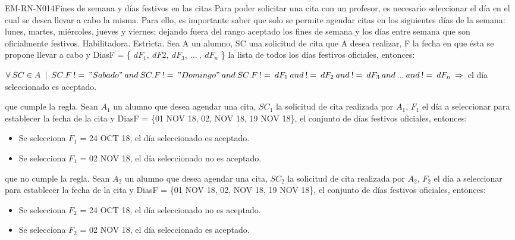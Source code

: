 \begin{BussinesRule}{EM-RN-N014}{Fines de semana y días festivos en las citas}
	\BRitem[Descripción:] Para poder solicitar una cita con un profesor, es necesario seleccionar el día en el cual se desea llevar a cabo la misma. Para ello, es importante saber que solo se permite agendar citas en los siguientes días de la semana: lunes, martes, miércoles, jueves y viernes; dejando fuera del rango aceptado los fines de semana y los días entre semana que son oficialmente festivos. 
	\BRitem[Tipo: ] Habilitadora.
	\BRitem[Nivel: ] Estricta.
	\BRitem[Sentencia : ] Sea A un alumno, SC una solicitud de cita que A desea realizar, F la fecha en que ésta se propone llevar a cabo y DiasF = \{ $dF_{1}, \: dF{2}, \: dF_{3}, \: ... \: , \: dF_{n}$ \} la lista de todos los días festivos oficiales, entonces:
	\begin{center}
		$\forall \: SC \in A \: \mid \: SC.F \: != \: "Sabado" \: and \: SC.F \: != \: "Domingo" \: and \: SC.F \: != \: dF_{1} \: and \: != \: dF_{2} \: and \: != \: dF_{3} \: and \: ... \: and \: != \: dF_{n} \: \Rightarrow$ el día seleccionado es aceptado.
	\end{center}
	 que cumple la regla.
		Sean $A_{1}$ un alumno que desea agendar una cita, $SC_{1}$ la solicitud de cita realizada por $A_{1}$, $F_{1}$ el día a seleccionar para establecer la fecha de la cita y DiasF = \{01 NOV 18, 02, NOV 18, 19 NOV 18\}, el conjunto de días festivos oficiales, entonces:
		\begin{itemize}
			\item Se selecciona $F_{1}$ = 24 OCT 18, el día seleccionado es aceptado.
			\item Se selecciona $F_{1}$ = 02 NOV 18, el día seleccionado no es aceptado.
		\end{itemize}
	 que no cumple la regla.
		Sean $A_{2}$ un alumno que desea agendar una cita, $SC_{2}$ la solicitud de cita realizada por $A_{2}$, $F_{2}$ el día a seleccionar para establecer la fecha de la cita y DiasF = \{01 NOV 18, 02, NOV 18, 19 NOV 18\}, el conjunto de días festivos oficiales, entonces:
		\begin{itemize}
			\item Se selecciona $F_{2}$ = 24 OCT 18, el día seleccionado no es aceptado.
			\item Se selecciona $F_{2}$ = 02 NOV 18, el día seleccionado es aceptado.
		\end{itemize}

\end{BussinesRule}


